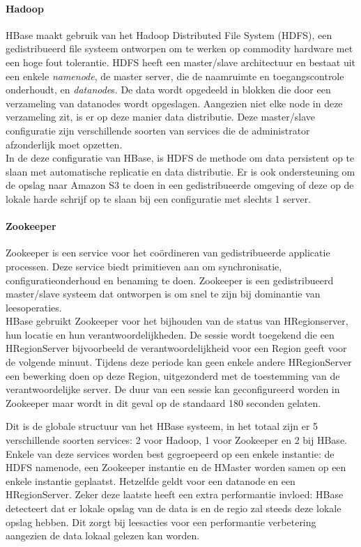 \paragraph{Hadoop\cite{borthakur2007hadoop}} HBase maakt gebruik van het Hadoop Distributed File System (HDFS), een gedistribueerd file systeem ontworpen om te werken op commodity hardware met een hoge fout tolerantie. HDFS heeft een master/slave architectuur en bestaat uit een enkele \textit{namenode}, de master server, die de naamruimte en toegangscontrole onderhoudt, en \textit{datanode}s. De data wordt opgedeeld in blokken die door een verzameling van datanodes wordt opgeslagen. Aangezien niet elke node in deze verzameling zit, is er op deze manier data distributie. Deze master/slave configuratie zijn verschillende soorten van services die de administrator afzonderlijk moet opzetten. \\
In de deze configuratie van HBase, is HDFS de methode om data persistent op te slaan met automatische replicatie en data distributie. Er is ook ondersteuning om de opslag naar Amazon S3 te doen in een gedistribueerde omgeving of deze op de lokale harde schrijf op te slaan bij een configuratie met slechts 1 server.\cite{george2011hbase}

\paragraph{Zookeeper\cite{hunt2010zookeeper}} Zookeeper is een service voor het coördineren van gedistribueerde applicatie processen. Deze service biedt primitieven aan om synchronisatie, configuratieonderhoud en benaming te doen. Zookeeper is een gedistribueerd master/slave systeem dat ontworpen is om snel te zijn bij dominantie van leesoperaties.  \\
HBase gebruikt Zookeeper voor het bijhouden van de status van HRegionserver, hun locatie en hun verantwoordelijkheden. De sessie wordt toegekend die een HRegionServer bijvoorbeeld de verantwoordelijkheid voor een Region geeft voor de volgende minuut. Tijdens deze periode kan geen enkele andere HRegionServer een bewerking doen op deze Region, uitgezonderd met de toestemming van de verantwoordelijke server. \cite{george2011hbase} De duur van een sessie kan geconfigureerd worden in Zookeeper maar wordt in dit geval op de standaard 180 seconden gelaten. 

Dit is de globale structuur van het HBase systeem, in het totaal zijn er 5 verschillende soorten services: 2 voor Hadoop, 1 voor Zookeeper en 2 bij HBase. Enkele van deze services worden best gegroepeerd op een enkele instantie: de HDFS namenode, een Zookeeper instantie en de HMaster worden samen op een enkele instantie geplaatst. Hetzelfde geldt voor een datanode en een HRegionServer. Zeker deze laatste heeft een extra performantie invloed: HBase detecteert dat er lokale opslag van de data is en de regio zal steeds deze lokale opslag hebben. Dit zorgt bij leesacties voor een performantie verbetering aangezien de data lokaal gelezen kan worden.

